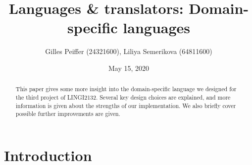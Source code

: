 \documentclass[journal]{IEEEtran}
\title{Languages \& translators: Domain-specific languages}
\author{Gilles Peiffer (24321600), Liliya Semerikova (64811600)}
\date{May 15, 2020}
\theoremstyle{definition}
\begin{document}
\maketitle

\begin{abstract}
	This paper gives some more insight into the domain-specific language we designed for the third project of LINGI2132.
	Several key design choices are explained, and more information is given about the strengths of our implementation.
	We also briefly cover possible further improvements are given.
\end{abstract}

\section{Introduction}

\printbibliography
\end{document}
